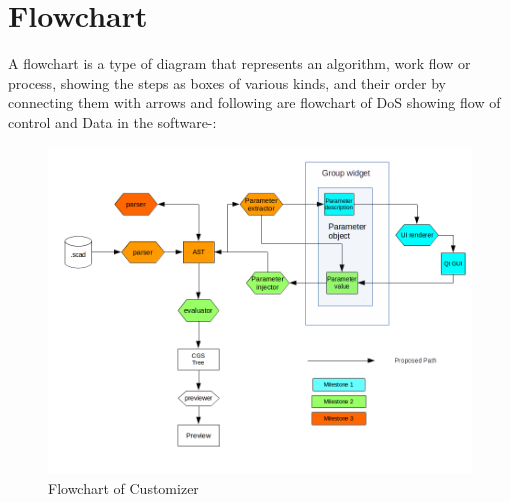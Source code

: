 \section{Flowchart}
A flowchart is a type of diagram that represents an algorithm, work flow or process, showing the steps as boxes of various kinds, and their order by connecting them with arrows
and following are flowchart of DoS showing flow of control and Data in the software-:


\begin{figure}[H]
\centering \includegraphics[scale=0.6]{images/flowchart.png}
\caption{Flowchart of Customizer}
\label{fig:FD1}
\end{figure}
